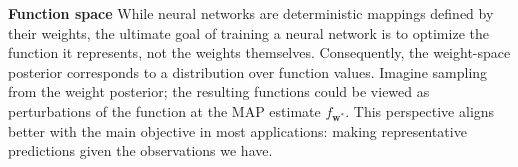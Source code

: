 \documentclass{article}
\newcommand{\mbf}[1]{\mathbf{#1}}
\newcommand{\vw}{\mbf{w}}
\begin{document}
\textbf{Function space}
While neural networks are deterministic mappings defined by their weights, the ultimate goal of training a neural network is to optimize the function it represents, not the weights themselves. Consequently, the weight-space posterior corresponds to a distribution over function values. Imagine sampling from the weight posterior; the resulting functions could be viewed as perturbations of the function at the MAP estimate $f_{\vw^*}$. This perspective aligns better with the main objective in most applications: making representative predictions given the observations we have.
\end{document}
